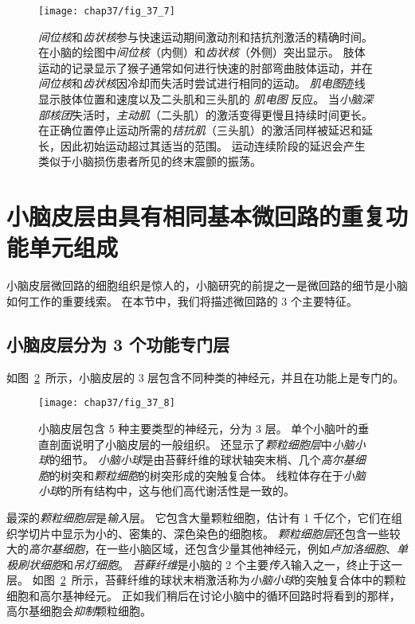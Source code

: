\begin{figure}[htbp]
	\centering
	\texttt{[image: chap37/fig\_37\_7]}
	\caption{\textit{间位核}和\textit{齿状核}参与快速运动期间激动剂和拮抗剂激活的精确时间。
		在小脑的绘图中\textit{间位核}（内侧）和\textit{齿状核}（外侧）突出显示。
		肢体运动的记录显示了猴子通常如何进行快速的肘部弯曲肢体运动，并在\textit{间位核}和\textit{齿状核}因冷却而失活时尝试进行相同的运动。
		\textit{肌电图}迹线显示肢体位置和速度以及二头肌和三头肌的 \textit{肌电图} 反应。
		当\textit{小脑深部核团}失活时，\textit{主动肌}（二头肌）的激活变得更慢且持续时间更长。
		在正确位置停止运动所需的\textit{拮抗肌}（三头肌）的激活同样被延迟和延长，因此初始运动超过其适当的范围。
		运动连续阶段的延迟会产生类似于小脑损伤患者所见的终末震颤的振荡。}
	\label{fig:37_7}
\end{figure}




\section{小脑皮层由具有相同基本微回路的重复功能单元组成}

小脑皮层微回路的细胞组织是惊人的，小脑研究的前提之一是微回路的细节是小脑如何工作的重要线索。
在本节中，我们将描述微回路的 3 个主要特征。


\subsection{小脑皮层分为 3 个功能专门层}

如图~\ref{fig:37_8}~所示，小脑皮层的 3 层包含不同种类的神经元，并且在功能上是专门的。


\begin{figure}[htbp]
	\centering
	\texttt{[image: chap37/fig\_37\_8]}
	\caption{小脑皮层包含 5 种主要类型的神经元，分为 3 层。
		单个小脑叶的垂直剖面说明了小脑皮层的一般组织。
		还显示了\textit{颗粒细胞层}中\textit{小脑小球}的细节。
		\textit{小脑小球}是由苔藓纤维的球状轴突末梢、几个\textit{高尔基细胞}的树突和\textit{颗粒细胞}的树突形成的突触复合体。
		线粒体存在于\textit{小脑小球}的所有结构中，这与他们高代谢活性是一致的。}
	\label{fig:37_8}
\end{figure}


最深的\textit{颗粒细胞层}是\textit{输入}层。
它包含大量颗粒细胞，估计有 1 千亿个，它们在组织学切片中显示为小的、密集的、深色染色的细胞核。
\textit{颗粒细胞层}还包含一些较大的\textit{高尔基细胞}，在一些小脑区域，还包含少量其他神经元，例如\textit{卢加洛细胞}、\textit{单极刷状细胞}和\textit{吊灯细胞}。
\textit{苔藓纤维}是小脑的 2 个主要\textit{传入}输入之一，终止于这一层。
如图~\ref{fig:37_8}~所示，苔藓纤维的球状末梢激活称为\textit{小脑小球}的突触复合体中的颗粒细胞和高尔基神经元。
正如我们稍后在讨论小脑中的循环回路时将看到的那样，高尔基细胞会\textit{抑制}颗粒细胞。


